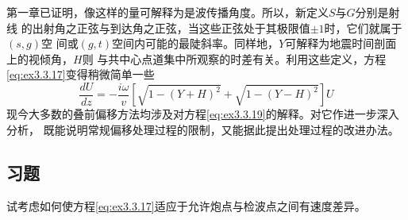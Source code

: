 第一章已证明，像这样的量可解释为是波传播角度。所以，新定义$S$与$G$分别是射线
的出射角之正弦与到达角之正弦，当这些正弦处于其极限值$±1$时，它们就属于$(s,g)$空
间或$(g,t)$空间内可能的最陡斜率。同样地，$Y$可解释为地震时间剖面上的视倾角，$H$则
与共中心点道集中所观察的时差有关。利用这些定义，方程\ref{eq:ex3.3.17}变得稍微简单一些
\begin{equation}
\frac{dU}{dz}=-\frac{i\omega}{v}[\sqrt{1-(Y+H)^2}+\sqrt{1-(Y-H)^2}]U
\label{eq:ex3.3.19}
\end{equation}
现今大多数的叠前偏移方法均涉及对方程\ref{eq:ex3.3.19}的解释。对它作进一步深入分析，
既能说明常规偏移处理过程的限制，又能据此提出处理过程的改进办法。

\subsection{习题}
\label{sec:3.3.6}
试考虑如何使方程\ref{eq:ex3.3.17}适应于允许炮点与检波点之间有速度差异。
